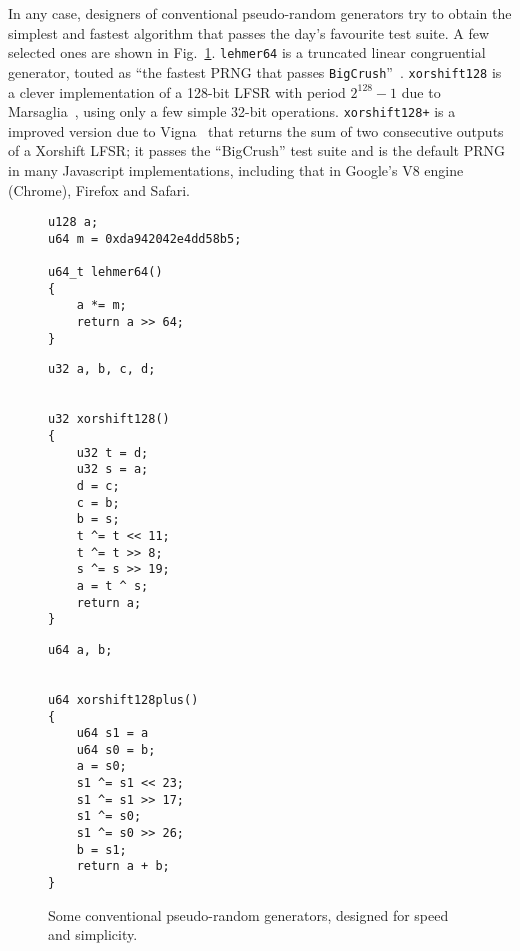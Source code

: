 \documentclass[submission,svgnames,journal=tosc]{iacrtrans}
\begin{document}
In any case, designers of conventional pseudo-random generators try to obtain
the simplest and fastest algorithm that passes the day's favourite test suite. A
few selected ones are shown in Fig.~\ref{fig:prngs}. \texttt{lehmer64} is a
truncated linear congruential generator, touted as ``the fastest PRNG that
passes \texttt{BigCrush}''~\cite{LemireLehmer}. \texttt{xorshift128} is a clever
implementation of a 128-bit LFSR with period $2^{128} - 1$ due to
Marsaglia~\cite{Marsaglia03}, using only a few simple 32-bit
operations. \texttt{xorshift128+} is a improved version due to
Vigna~\cite{Vigna17} that returns the sum of two consecutive outputs of a
Xorshift LFSR; it passes the ``BigCrush'' test suite and is the default PRNG in
many Javascript implementations, including that in Google's V8 engine (Chrome),
Firefox and Safari.

\begin{figure}
  \begin{minipage}[t]{5cm}
\begin{verbatim}
u128 a;
u64 m = 0xda942042e4dd58b5;

u64_t lehmer64() 
{
    a *= m;
    return a >> 64;
}
\end{verbatim}
  \end{minipage}
    \begin{minipage}[t]{4cm}
\begin{verbatim}
u32 a, b, c, d;


u32 xorshift128()
{
    u32 t = d;
    u32 s = a;
    d = c;
    c = b;
    b = s;
    t ^= t << 11;
    t ^= t >> 8;
    s ^= s >> 19;
    a = t ^ s;
    return a;
}
\end{verbatim}
    \end{minipage}
    \begin{minipage}[t]{4cm}
\begin{verbatim}
u64 a, b;


u64 xorshift128plus()
{
    u64 s1 = a
    u64 s0 = b;
    a = s0;
    s1 ^= s1 << 23;        
    s1 ^= s1 >> 17;        
    s1 ^= s0;        
    s1 ^= s0 >> 26;
    b = s1;
    return a + b;
}
\end{verbatim}
    \end{minipage}
    \caption{Some conventional pseudo-random generators, designed for speed and simplicity.}
    \label{fig:prngs}
  \end{figure}
  
\end{document}
